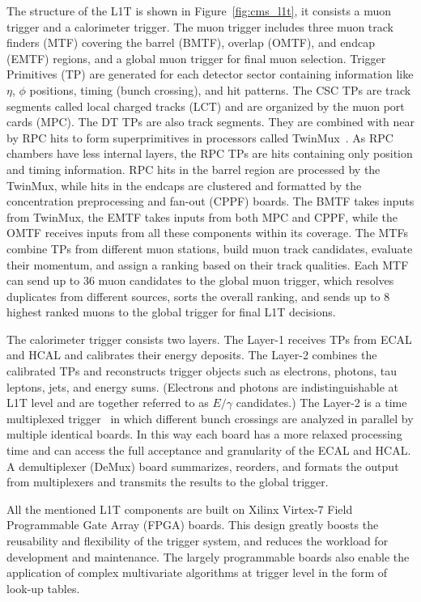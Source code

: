 The structure of the L1T is shown in Figure~\ref{fig:cms_l1t}, 
it consists a muon trigger and a calorimeter trigger.
The muon trigger includes three muon track finders (MTF) covering the barrel (BMTF), overlap (OMTF), and endcap (EMTF) regions,
and a global muon trigger for final muon selection. 
Trigger Primitives (TP) are generated for each detector sector containing information like $\eta$, $\phi$ positions, timing (bunch crossing), and hit patterns.
The CSC TPs are track segments called local charged tracks (LCT) and are organized by the muon port cards (MPC).
The DT TPs are also track segments. 
They are combined with near by RPC hits to form superprimitives in processors called TwinMux~\cite{CMS-DP-2016-074}.
As RPC chambers have less internal layers, the RPC TPs are hits containing only position and timing information.
RPC hits in the barrel region are processed by the TwinMux, while hits in the endcaps are clustered and formatted by the concentration preprocessing and fan-out (CPPF) boards.
The BMTF takes inputs from TwinMux, the EMTF takes inputs from both MPC and CPPF, 
while the OMTF receives inputs from all these components within its coverage.
The MTFs combine TPs from different muon stations, build muon track candidates, 
evaluate their momentum, and assign a ranking based on their track qualities.
Each MTF can send up to 36 muon candidates to the global muon trigger, 
which resolves duplicates from different sources, sorts the overall ranking, 
and sends up to 8 highest ranked muons to the global trigger for final L1T decisions.

The calorimeter trigger consists two layers. 
The Layer-1 receives TPs from ECAL and HCAL and calibrates their energy deposits. 
The Layer-2 combines the calibrated TPs and reconstructs trigger objects such as electrons, photons, tau leptons, jets, and energy sums.
(Electrons and photons are indistinguishable at L1T level and are together referred to as $E/\gamma$ candidates.)
The Layer-2 is a time multiplexed trigger~\cite{Frazier_2012} in which different bunch crossings are analyzed in parallel by multiple identical boards. 
In this way each board has a more relaxed processing time and can access the full acceptance and granularity of the ECAL and HCAL.
A demultiplexer (DeMux) board summarizes, reorders, and formats the output from multiplexers and transmits the results to the global trigger.

All the mentioned L1T components are built on Xilinx Virtex-7 Field Programmable Gate Array (FPGA) boards.
This design greatly boosts the reusability and flexibility of the trigger system, and reduces the workload for development and maintenance.
The largely programmable boards also enable the application of complex multivariate algorithms at trigger level in the form of look-up tables.

